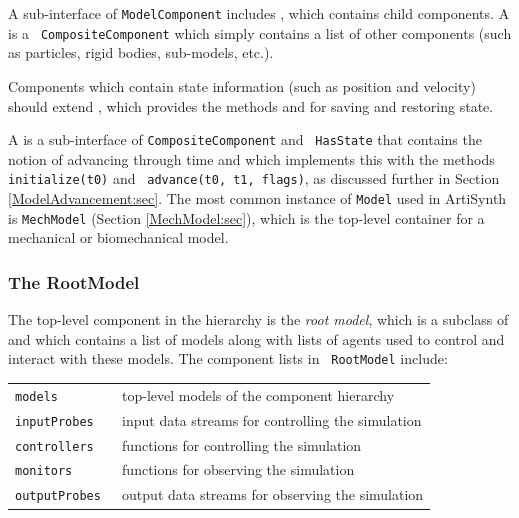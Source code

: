 A sub-interface of {\tt ModelComponent} includes
, which
contains child components.  A
 is a {\tt
CompositeComponent} which simply contains a list of other components
(such as particles, rigid bodies, sub-models, etc.).

Components which contain state information (such as position and
velocity) should extend 
, 
which provides the methods
and
for saving and restoring state.

A
is a sub-interface of {\tt CompositeComponent} and {\tt
HasState} that contains the notion of advancing through time and which
implements this with the methods {\tt initialize(t0)} and {\tt
advance(t0, t1, flags)}, as discussed further in
Section \ref{ModelAdvancement:sec}.
The most common instance of {\tt Model} used
in ArtiSynth is {\tt MechModel} (Section \ref{MechModel:sec}), which
is the top-level container for a mechanical or biomechanical model.

\subsubsection{The RootModel}
\label{RootModel:sec}

The top-level component in the hierarchy is the {\it root model},
which is a subclass of 
and which contains a list of models along with lists of agents used to
control and interact with these models. The component lists in {\tt
RootModel} include:

\begin{shadedregion}
\begin{tabular}{ll}
\tt models & top-level models of the component hierarchy \\
\tt inputProbes & input data streams for controlling the simulation \\
\tt controllers & functions for controlling the simulation \\
\tt monitors & functions for observing the simulation \\
\tt outputProbes & output data streams for observing the simulation \\
\end{tabular}
\end{shadedregion}

